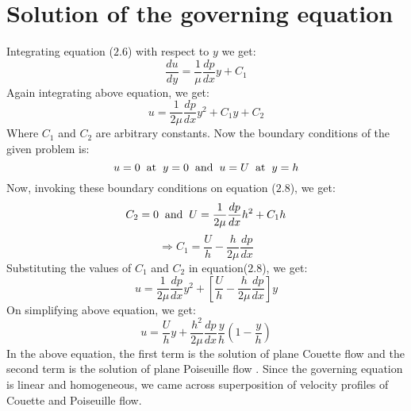 \documentclass[14pt,one side, a4paper]{extbook}
\begin{document}
	 	\section{Solution of the governing equation}
	 	Integrating equation ($2.6$) with respect to $y$ we get:
	 	\begin{equation}
	 		\frac{{du}}{{dy}}=\frac{1}{\mu}\frac{dp}{dx}y+C_{1}
	 	\end{equation} 
	 	Again integrating above equation, we get:
	 	\begin{equation}
	 		u=\frac{1}{2\mu}\frac{dp}{dx}y^{2}+C_{1}y+C_{2}	
	 	\end{equation} 
	 	Where $C_{1}$ and $C_{2}$ are arbitrary constants. Now the boundary conditions of the given problem is:
	 	\begin{equation}
	 		u=0\hspace{0.2cm} \textrm{at}\hspace*{0.2cm} y=0 \hspace{0.2cm}\textrm{and}\hspace{0.2cm}u=U \hspace{0.2cm}\textrm{at}\hspace{0.2cm} y=h
	 	\end{equation} 
	 	Now, invoking these boundary conditions on equation ($2.8$), we get:
	 	\begin{equation}
	 		C_{2}=0 \hspace{0.2cm}\textrm{and}\hspace{0.2cm}
	 		U=\frac{1}{2\mu}\frac{dp}{dx}h^{2}+C_{1}h
	 	\end{equation} 
	 	\begin{equation}
	 		\Longrightarrow C_{1}=\frac{U}{h}-\frac{h}{2\mu}\frac{dp}{dx}
	 	\end{equation}
	 	Substituting the values of $C_{1}$ and $C_{2}$ in equation($2.8$), we get:
	 	\begin{equation}
	 		u=\frac{1}{2\mu}\frac{dp}{dx}y^{2}+\left[\frac{U}{h}-\frac{h}{2\mu}\frac{dp}{dx}\right]y
	 	\end{equation}
	 	On simplifying above equation, we get:
	 	\begin{equation}
	 		u=\frac{U}{h}y+\frac{h^{2}}{2\mu}\frac{dp}{dx}\frac{y}{h}\left(1-\frac{y}{h}\right)
	 	\end{equation} 
	 	In the above equation, the first term is the solution of plane Couette flow and the second term is the solution of plane Poiseuille flow \label{Equa} . 
	 	Since the governing equation is linear and homogeneous, we came across superposition of velocity profiles of Couette and Poiseuille flow. 
	 	
\end{document}
